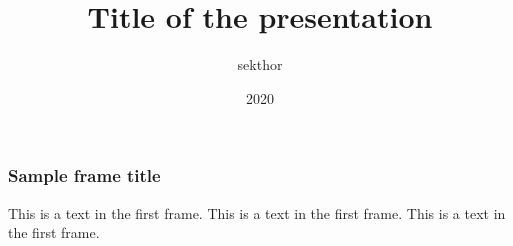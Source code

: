 \documentclass{beamer}
\title{Title of the presentation}
\author{sekthor}
\institute{Wherever}
\date{2020}
\begin{document}
\frame{\titlepage}

\begin{frame}
    \frametitle{Sample frame title}
This is a text in the first frame. 
\pause
This is a text in the first frame.
This is a text in the first frame.
\end{frame}
    
\end{document}
